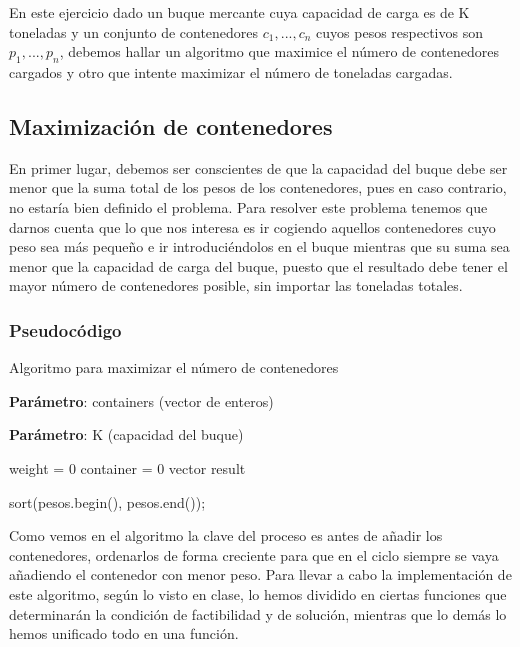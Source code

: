 En este ejercicio dado un buque mercante cuya capacidad de carga es de K toneladas y un conjunto de contenedores $c_1,...,c_n$ cuyos
pesos respectivos son $p_1,...,p_n$, debemos hallar un algoritmo que maximice el número de contenedores cargados y otro que intente 
maximizar el número de toneladas cargadas.

\subsection{Maximización de contenedores}

En primer lugar, debemos ser conscientes de que la capacidad del buque debe ser menor que la suma total de los pesos 
de los contenedores, pues en caso contrario, no estaría bien definido el problema. Para resolver este problema tenemos que darnos cuenta
que lo que nos interesa es ir cogiendo aquellos contenedores cuyo peso sea más pequeño e ir introduciéndolos en el buque mientras que su suma 
sea menor que la capacidad de carga del buque, puesto que el resultado debe tener el mayor número de contenedores posible, sin importar las 
toneladas totales. 

\subsubsection{Pseudocódigo}

\begin{algorithm}[H]
    \caption{Algoritmo para maximizar el número de contenedores}\label{alg:max_containers}
    \begin{minipage}{0.92\textwidth}
    \textbf{Parámetro}: containers (vector de enteros)

    \textbf{Parámetro}: K (capacidad del buque)

    \end{minipage}

    weight = 0\;
	container = 0\;
    vector result\;
  
    sort(pesos.begin(), pesos.end());

  
    
\end{algorithm}

Como vemos en el algoritmo la clave del proceso es antes de añadir los contenedores, ordenarlos de forma creciente para que 
en el ciclo siempre se vaya añadiendo el contenedor con menor peso. 
Para llevar a cabo la implementación de este algoritmo, según lo visto en clase, lo hemos dividido en ciertas funciones que 
determinarán la condición de factibilidad y de solución, mientras que lo demás lo hemos unificado todo en una función. 

